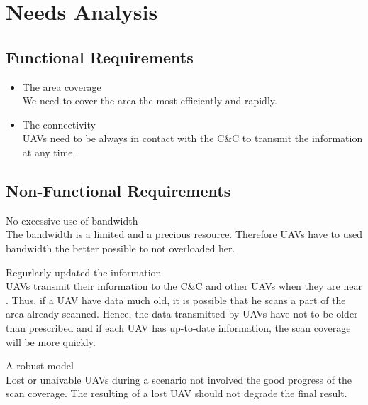 \chapter{Needs Analysis}

\section{Functional Requirements}

\begin{itemize}

\item The area coverage\\
We need to cover the area the most efficiently and rapidly.

\item The connectivity\\
UAVs need to be always in contact with the C\&C to transmit the information at any time.



\end{itemize}

\section{Non-Functional Requirements}

\item No excessive use of bandwidth\\
The bandwidth is a limited and a precious resource. Therefore UAVs have to used bandwidth the better possible to not overloaded her.

\item Regurlarly updated the information\\
UAVs transmit their information to the C\&C and other UAVs when they are near . Thus, if a UAV have data much old, it is possible that he scans a part of the area already scanned. Hence, the data transmitted by UAVs have not to be older than prescribed and if each UAV has up-to-date information, the scan coverage will be more quickly.

\item A robust model\\
Lost or unaivable UAVs during a scenario not involved the good progress of the scan coverage. The resulting of a lost UAV should not degrade the final result.